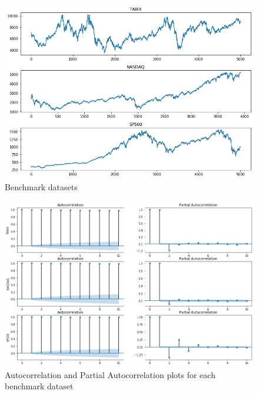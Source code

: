 \begin{figure}
    \centering
    \includegraphics[width=\textwidth]{figures/datasets.png}
    \caption{Benchmark datasets}
    \label{fig:datasets}
\end{figure}

\begin{figure}
    \centering
    \includegraphics[width=\textwidth]{figures/datasets_acf.png}
    \caption{Autocorrelation and Partial Autocorrelation plots for each benchmark dataset}
    \label{fig:datasets_acf}
\end{figure}

